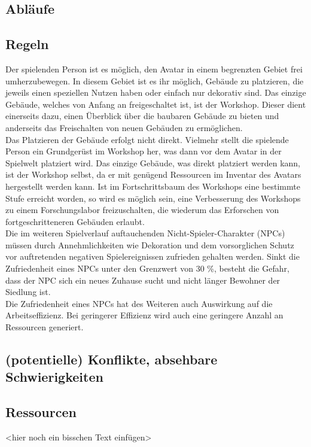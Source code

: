 \documentclass[paper=A4,pagesize=auto,12pt,headinclude=true,footinclude=true,BCOR=0mm,DIV=calc]{scrartcl}
\newcommand{\sectionspace}{
	\vspace{0.5cm}
}
\begin{document}
\sectionspace
\subsection{Abläufe}\label{sec:Ablaeufe}

\sectionspace
\subsection{Regeln}
Der spielenden Person ist es möglich, den Avatar in einem begrenzten Gebiet frei umherzubewegen. In diesem Gebiet ist es ihr möglich, Gebäude zu platzieren, die jeweils einen speziellen Nutzen haben oder einfach nur dekorativ sind. Das einzige Gebäude, welches von Anfang an freigeschaltet ist, ist der Workshop. Dieser dient einerseits dazu, einen Überblick über die baubaren Gebäude zu bieten und anderseits das Freischalten von neuen Gebäuden zu ermöglichen. \\
Das Platzieren der Gebäude erfolgt nicht direkt. Vielmehr stellt die spielende Person ein Grundgerüst im Workshop her, was dann vor dem Avatar in der Spielwelt platziert wird. Das einzige Gebäude, was direkt platziert werden kann, ist der Workshop selbst, da er mit genügend Ressourcen im Inventar des Avatars hergestellt werden kann.
Ist im Fortschrittsbaum des Workshops eine bestimmte Stufe erreicht worden, so wird es möglich sein, eine Verbesserung des Workshops zu einem Forschungslabor freizuschalten, die wiederum das Erforschen von fortgeschritteneren Gebäuden erlaubt. \\
Die im weiteren Spielverlauf auftauchenden Nicht-Spieler-Charakter (NPCs) müssen durch Annehmlichkeiten wie Dekoration und dem vorsorglichen Schutz vor auftretenden negativen Spielereignissen zufrieden gehalten werden. Sinkt die Zufriedenheit eines NPCs unter den Grenzwert von 30 \%, besteht die Gefahr, dass der NPC sich ein neues Zuhause sucht und nicht länger Bewohner der Siedlung ist. \\ %
Die Zufriedenheit eines NPCs hat des Weiteren auch Auswirkung auf die Arbeitseffizienz. Bei geringerer Effizienz wird auch eine geringere Anzahl an Ressourcen generiert.


\sectionspace
\subsection{(potentielle) Konflikte, absehbare Schwierigkeiten}

\sectionspace
\subsection{Ressourcen}\label{sec:Ressourcen}
<hier noch ein bisschen Text einfügen>
\end{document}
